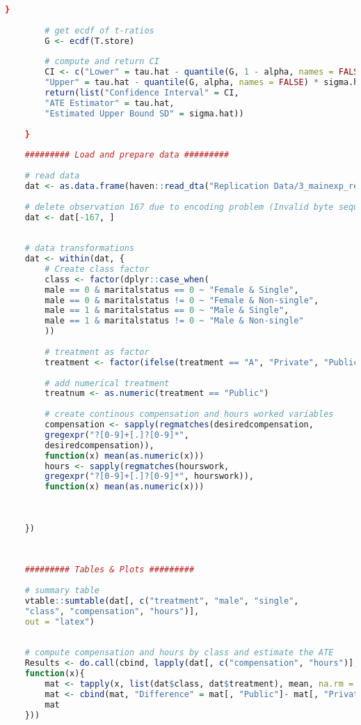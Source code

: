\documentclass[aodsor,preprint]{imsart}
\numberwithin{equation}{section}
\theoremstyle{plain}
\begin{document}
\begin{lstlisting}[language=R, basicstyle=\tiny\tiny]
		}
		
		# get ecdf of t-ratios
		G <- ecdf(T.store)
		
		# compute and return CI
		CI <- c("Lower" = tau.hat - quantile(G, 1 - alpha, names = FALSE) * sigma.hat / sqrt(n),
		"Upper" = tau.hat - quantile(G, alpha, names = FALSE) * sigma.hat / sqrt(n))
		return(list("Confidence Interval" = CI,
		"ATE Estimator" = tau.hat,
		"Estimated Upper Bound SD" = sigma.hat))
		
	}
	
	######### Load and prepare data ######### 
	
	# read data
	dat <- as.data.frame(haven::read_dta("Replication Data/3_mainexp_responses.dta"))
	
	# delete observation 167 due to encoding problem (Invalid byte sequence)
	dat <- dat[-167, ]
	
	
	# data transformations
	dat <- within(dat, {
		# Create class factor
		class <- factor(dplyr::case_when(
		male == 0 & maritalstatus == 0 ~ "Female & Single",
		male == 0 & maritalstatus != 0 ~ "Female & Non-single",
		male == 1 & maritalstatus == 0 ~ "Male & Single",
		male == 1 & maritalstatus != 0 ~ "Male & Non-single"
		))
		
		# treatment as factor
		treatment <- factor(ifelse(treatment == "A", "Private", "Public"))
		
		# add numerical treatment
		treatnum <- as.numeric(treatment == "Public")
		
		# create continous compensation and hours worked variables
		compensation <- sapply(regmatches(desiredcompensation, 
		gregexpr("?[0-9]+[.]?[0-9]*",
		desiredcompensation)),
		function(x) mean(as.numeric(x)))
		hours <- sapply(regmatches(hourswork,
		gregexpr("?[0-9]+[.]?[0-9]*", hourswork)),
		function(x) mean(as.numeric(x)))
		
		
		
	})
	
	
	
	######### Tables & Plots #########
	
	# summary table
	vtable::sumtable(dat[, c("treatment", "male", "single",
	"class", "compensation", "hours")],
	out = "latex")
	
	
	# compute compensation and hours by class and estimate the ATE
	Results <- do.call(cbind, lapply(dat[, c("compensation", "hours")],
	function(x){
		mat <- tapply(x, list(dat$class, dat$treatment), mean, na.rm = TRUE)
		mat <- cbind(mat, "Difference" = mat[, "Public"]- mat[, "Private"])
		mat
	}))
	

\end{lstlisting}
\end{document}
